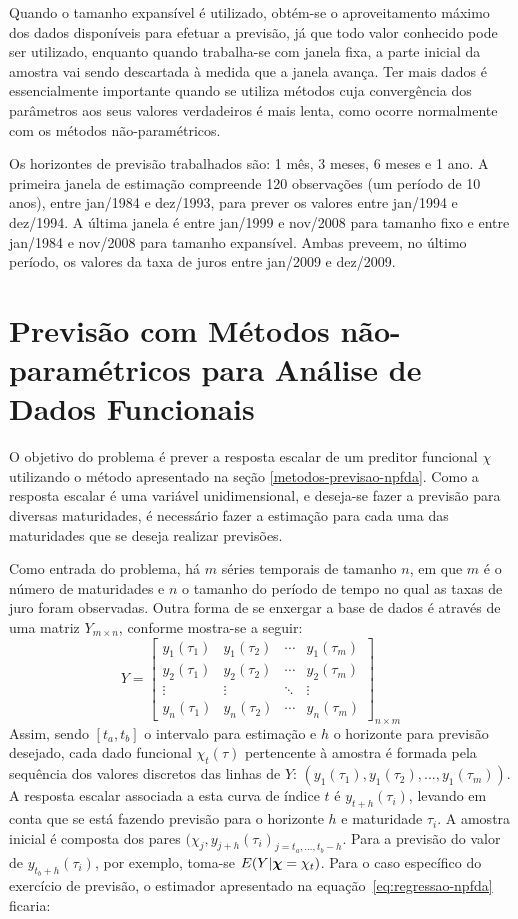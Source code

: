 \documentclass[
	12pt,				%
	openright,			%
	oneside,			%
	a4paper,			%
	english,			%
	brazil				%
	]{dissertacao-ufrgs-abntex2}
\begin{document}
Quando o tamanho expansível é utilizado, obtém-se o aproveitamento máximo dos dados disponíveis para efetuar a previsão, já que todo valor conhecido pode ser utilizado, enquanto quando trabalha-se com janela fixa, a parte inicial da amostra vai sendo descartada à medida que a janela avança. Ter mais dados é essencialmente importante quando se utiliza métodos cuja convergência dos parâmetros aos seus valores verdadeiros é mais lenta, como ocorre normalmente com os métodos não-paramétricos. 

Os horizontes de previsão trabalhados são: 1 mês, 3 meses, 6 meses e 1 ano.
A primeira janela de estimação compreende 120 observações (um período de 10 anos), entre jan/1984 e dez/1993, para prever os valores entre jan/1994 e dez/1994. A última janela é entre jan/1999 e nov/2008 para tamanho fixo e entre jan/1984 e nov/2008 para tamanho expansível. Ambas preveem, no último período, os valores da taxa de juros entre jan/2009 e dez/2009.

\section{Previsão com Métodos não-paramétricos para Análise de Dados Funcionais} \label{metodologia-npfda}

O objetivo do problema é prever a resposta escalar de um preditor funcional $\chi$ utilizando o método apresentado na seção \ref{metodos-previsao-npfda}. Como a resposta escalar é uma variável unidimensional, e deseja-se fazer a previsão para diversas maturidades, é necessário fazer a estimação para cada uma das maturidades que se deseja realizar previsões.

Como entrada do problema, há $m$ séries temporais de tamanho $n$, em que $m$ é o número de maturidades e $n$ o tamanho do período de tempo no qual as taxas de juro foram observadas. Outra forma de se enxergar a base de dados é através de uma matriz $Y_{m \times n}$, conforme mostra-se a seguir:
\begin{equation} \label{eq:matriz-y}
Y = 
 \begin{bmatrix}
	  y_1(\tau_1) & y_1(\tau_2) & \cdots & y_1(\tau_m) \\
	  y_2(\tau_1) & y_2(\tau_2) & \cdots & y_2(\tau_m) \\
	  \vdots  & \vdots  & \ddots & \vdots  \\
	  y_n(\tau_1) & y_n(\tau_2) & \cdots & y_n(\tau_m)
 \end{bmatrix}_{n \times m}
\end{equation}
Assim, sendo $[t_a,t_b]$ o intervalo para estimação e $h$ o horizonte para previsão desejado, cada dado funcional $\chi_t(\tau)$ pertencente à amostra é formada pela sequência dos valores discretos das linhas de $Y$: $\left( y_1(\tau_1), y_1(\tau_2), ..., y_1(\tau_m) \right)$. 
A resposta escalar associada a esta curva de índice $t$ é $y_{t + h}(\tau_i)$, levando em conta que se está fazendo previsão para o horizonte $h$ e maturidade $\tau_i$. A amostra inicial é composta dos pares $(\chi_j,y_{j+h}(\tau_i)_{j=t_a,...,t_b-h}$. Para a previsão do valor de $y_{t_b+h}(\tau_i)$, por exemplo, toma-se $E(Y|\boldsymbol{\chi}=\chi_t)$. Para o caso específico do exercício de previsão, o estimador apresentado na equação~\ref{eq:regressao-npfda} ficaria:
\end{document}
